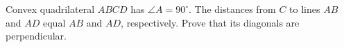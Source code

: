 Convex quadrilateral $ABCD$ has $\angle A=90^\circ$. The distances from $C$ to lines $AB$ and $AD$ equal $AB$ and $AD$, respectively. Prove that its diagonals are perpendicular.
